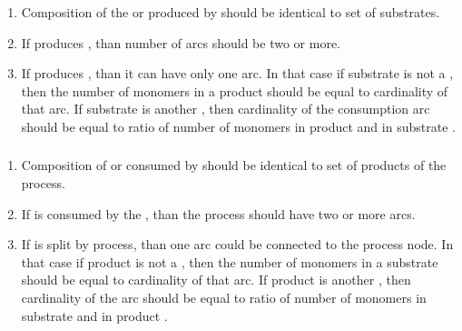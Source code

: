   \begin{enumerate}
    \item Composition of the  or  produced by
     should be identical to set of  substrates.
    \item If  produces , than number of 
     arcs should be two or more.
    \item If  produces , than it can have only one 
     arc. In that case if substrate is not a
    , then the number of monomers in a product 
    should be equal to cardinality of that arc. If substrate is another
    , then cardinality of the consumption arc should be equal to
    ratio of number of monomers in product and in substrate .
  \end{enumerate}  

\subsubsection{}
  \begin{enumerate}
    \item Composition of  or  consumed by
     should be identical to set of products of the process.
    \item If  is consumed by the , than the
    process should have two or more  arcs.
    \item If  is split by  process, than
    one  arc could be connected to the process node. In that case if product is not a
    , then the number of monomers in a substrate 
    should be equal to cardinality of that arc. If product is another
    , then cardinality of the  arc should be equal to
    ratio of number of monomers in substrate and in product .
  \end{enumerate}  
  